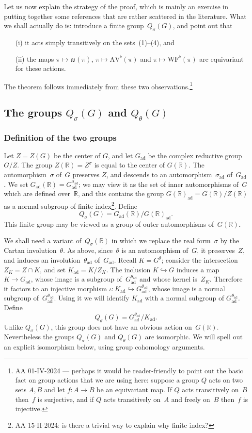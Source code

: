 \documentclass[10pt,leqno]{article}
\newcommand{\ad}{\mathrm{ad}}
\newcommand{\Gad}{G_\mathrm{ad}}
\newcommand{\Kad}{K_\mathrm{ad}}
\newcommand{\R}{\mathbb R}
\newcommand{\AV}{\mathrm{AV}}
\newcommand{\WF}{\mathrm{WF}}
\begin{document}
Let us now explain the strategy of the proof, which is mainly an exercise in putting together some references that are rather scattered in the literature. What we shall actually do is: introduce a finite group~$Q_\sigma(G)$, and point out that 
\begin{itemize}
\item[(i)] it acts simply transitively on the sets~(1)--(4), and 
\item[(ii)] the maps $\pi \mapsto \mathfrak{w}(\pi)$, $\pi \mapsto \AV^\flat(\pi)$ and $\pi\mapsto \WF^\flat(\pi)$  are equivariant for these actions.
\end{itemize}
The theorem follows immediately from these two observations.\footnote{AA 01-IV-2024 --- perhaps it would be reader-friendly to point out the basic fact on group actions that we are using here: suppose a group $Q$ acts on two sets $A, B$ and let $f\colon A \to B$ be an equivariant map. If $Q$ acts transitively on~$B$  then~$f$ is surjective, and if $Q$ acts transitively on~$A$ and freely on~$B$ then~$f$ is injective.  }

\subsection{The groups $Q_\sigma(G)$ and $Q_{\theta}(G)$}

\subsubsection{Definition of the two groups}Let $Z=Z(G)$ be the center of $G$, and let $\Gad$ be the complex reductive group~$G/Z$. The group $Z(\R)=Z^{\sigma}$ is equal to the center of $G(\R)$. The automorphism~$\sigma$ of~$G$ preserves $Z$, and descends to an automorphism~$\sigma_{\ad}$ of~$\Gad$. We set $\Gad(\R)=\Gad^{\sigma_{\ad}}$; we may view it as the set of inner automorphisms of~$G$ which are defined over~$\R$, and this contains the group $G(\R)_{\mathrm{ad}}=G(\R)/Z(\R)$ as a normal subgroup of finite index\footnote{AA 15-II-2024: is there a trivial way to explain why finite index?}.
Define 
$$
Q_\sigma(G)=\Gad(\R)/G(\R)_{\mathrm{ad}}.
$$
This finite group may be viewed as a group of outer automorphisms of~$G(\R)$. 

We shall need a variant of~$Q_{\sigma}(\R)$ in which we replace the real form~$\sigma$ by the Cartan involution~$\theta$. As above, since~$\theta$ is an automorphism of~$G$, it preserves~$Z$,  and induces an involution~$\theta_{\ad}$ of~$\Gad$. Recall $K=G^{\theta}$; consider the intersection $Z_K=Z \cap K$, and set  $K_{\ad}=K/Z_K$. The inclusion  $K \hookrightarrow G$ induces a map $K \to \Gad$, whose image is a subgroup of~$\Gad^{\theta_{\ad}}$ and whose kernel is~$Z_K$. Therefore it factors to an injective morphism $\iota\colon \Kad \hookrightarrow\Gad^{\theta_{\ad}} $, whose image is a normal subgroup of~$\Gad^{\theta_{\ad}}$. Using it we will identify $\Kad$ with a normal subgroup of $\Gad^{\theta_{\ad}}$. Define
\[ Q_\theta(G) = \Gad^{\theta_{\ad}}/\Kad.\]
Unlike $Q_{\sigma}(G)$, this group does not have an obvious action on~$G(\R)$. Nevertheless the groups $Q_{\sigma}(G)$ and $Q_{\theta}(G)$ are isomorphic. We will spell out an explicit isomorphism below, using group cohomology arguments.
\end{document}
